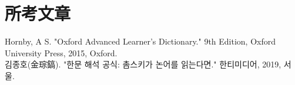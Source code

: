 \section{所考文章}
Hornby, A S. "Oxford Advanced Learner's Dictionary." 9th Edition, Oxford University Press, 2015, Oxford. \\
김종호(金琮鎬). "한문 해석 공식: 촘스키가 논어를 읽는다면." 한티미디어, 2019, 서울.
